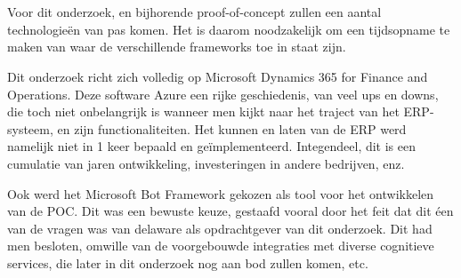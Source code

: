 \chapter{}
\label{ch:stand-van-zaken}
Voor dit onderzoek, en bijhorende proof-of-concept zullen een aantal technologieën van pas komen. Het is daarom noodzakelijk om een tijdsopname te maken van waar de verschillende frameworks toe in staat zijn. 

Dit onderzoek richt zich volledig op Microsoft Dynamics 365 for Finance and Operations. Deze software Azure een rijke geschiedenis, van veel ups en downs, die toch niet onbelangrijk is wanneer men kijkt naar het traject van het ERP-systeem, en zijn functionaliteiten. Het kunnen en laten van de ERP werd namelijk niet in 1 keer bepaald en geïmplementeerd. Integendeel, dit is een cumulatie van jaren ontwikkeling, investeringen in andere bedrijven, enz.
  
Ook werd het Microsoft Bot Framework gekozen als tool voor het ontwikkelen van de POC. Dit was een bewuste keuze, gestaafd vooral door het feit dat dit éen van de vragen was van delaware als opdrachtgever van dit onderzoek. Dit had men besloten, omwille van de voorgebouwde integraties met diverse cognitieve services, die later in dit onderzoek nog aan bod zullen komen, etc.

